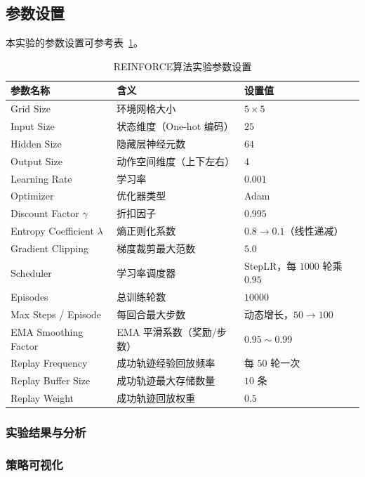 \subsection{参数设置}

本实验的参数设置可参考表~\ref{tab:reinforce-params}。

\begin{table}[htbp]
\centering
\caption{REINFORCE算法实验参数设置}
\label{tab:reinforce-params}
\begin{tabular}{@{}lll@{}}
\toprule
\textbf{参数名称} & \textbf{含义} & \textbf{设置值} \\
\midrule
Grid Size & 环境网格大小 & \( 5 \times 5 \) \\
Input Size & 状态维度（One-hot 编码） & \( 25 \) \\
Hidden Size & 隐藏层神经元数 & \( 64 \) \\
Output Size & 动作空间维度（上下左右） & \( 4 \) \\
Learning Rate & 学习率 & \( 0.001 \) \\
Optimizer & 优化器类型 & Adam \\
Discount Factor \(\gamma\) & 折扣因子 & \( 0.995 \) \\
Entropy Coefficient \(\lambda\) & 熵正则化系数 & \( 0.8 \rightarrow 0.1 \)（线性递减） \\
Gradient Clipping & 梯度裁剪最大范数 & \( 5.0 \) \\
Scheduler & 学习率调度器 & StepLR，每 \( 1000 \) 轮乘 \( 0.95 \) \\
Episodes & 总训练轮数 & \( 10000 \) \\
Max Steps / Episode & 每回合最大步数 & 动态增长，\( 50 \rightarrow 100 \) \\
EMA Smoothing Factor & EMA 平滑系数（奖励/步数） & \( 0.95 \sim 0.99 \) \\
Replay Frequency & 成功轨迹经验回放频率 & 每 \( 50 \) 轮一次 \\
Replay Buffer Size & 成功轨迹最大存储数量 & \( 10 \) 条 \\
Replay Weight & 成功轨迹回放权重 & \( 0.5 \) \\
\bottomrule
\end{tabular}
\end{table}

\subsubsection{实验结果与分析}

\subsubsection{策略可视化}

